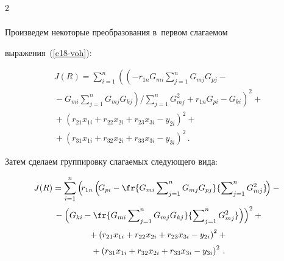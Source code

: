 \begin{multicols}{2}
\begin{multline}
  \label{e18-voh}

  \end{multline}

  

  Произведем некоторые преобразования в~первом сла\-га\-емом 

выражения~(\ref{e18-voh}):

  \begin{multline*}

  J(R)=\sum\limits^n_{i=1}

  \left(  \left(

  - r_{1{n}} G_{mi} 

\sum\limits^n_{j=1} G_{mj} G_{pj} -{}\right.\right.\\

\left.\left.{}-G_{mi} \sum\limits^n_{j=1} G_{mj} 

G_{kj}\!\right) \!\Bigg/\!  \sum\limits^n_{j=1} G_{mj}^2+

r_{1n} G_{pi} -G_{ki}\!\right)^2\!\!+\\

  {}+

  \left( r_{21}x_{1i} +r_{22}x_{2i} +r_{23}x_{3i}-y_{2i}\right)^2+{}\\

  {}+ \left( r_{31}x_{1i} +r_{32}x_{2i} +r_{33}x_{3i}-y_{3i}\right)^2\,.


  \end{multline*}


  Затем сделаем группировку слагаемых сле\-ду\-юще\-го вида:

  \begin{multline}

  J(R)= \sum\limits^n_{i=1} \left(\! r_{1n}\left(\! G_{pi} -\fr{G_{mi} 

\sum\nolimits^n_{j=1} G_{mj} G_{pj}} {\sum\nolimits^n_{j=1} G_{mj}^2} 

\!\right)-{}\right.\\[2pt]

  \left.{}-\left( G_{ki} -\fr{ G_{mi} \sum\nolimits^n_{j=1} G_{mj} G_{kj}}{ 

\sum\nolimits^n_{j=1} G_{mj}^2}\right) \right)^2+{}\\[2pt]

  {}+ \left( r_{21}x_{1i} +r_{22}x_{2i} +r_{23}x_{3i}-y_{2i}\right)^2+{}\\[2pt]

  {}+ \left( r_{31}x_{1i} +r_{32}x_{2i} +r_{33}x_{3i}-y_{3i}\right)^2\,.


\end{multline}
\end{multicols}
